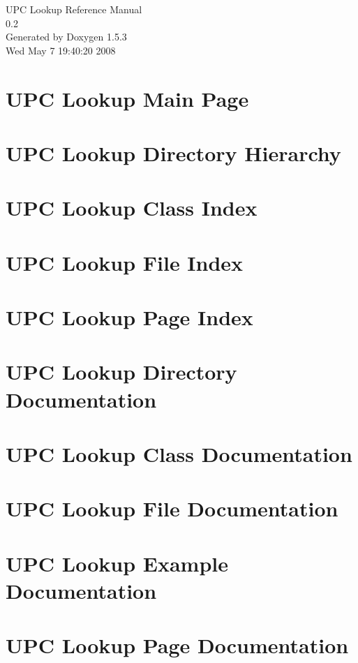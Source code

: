 \documentclass[letterpaper]{book}
\begin{document}
\begin{titlepage}
\vspace*{7cm}
\begin{center}
{\Large UPC Lookup Reference Manual\\[1ex]\large 0.2 }\\
\vspace*{1cm}
{\large Generated by Doxygen 1.5.3}\\
\vspace*{0.5cm}
{\small Wed May 7 19:40:20 2008}\\
\end{center}
\end{titlepage}
\clearemptydoublepage
{}
\tableofcontents
\clearemptydoublepage
{}
\chapter{UPC Lookup Main Page}
\label{index}\hypertarget{index}{}
\chapter{UPC Lookup Directory Hierarchy}

\chapter{UPC Lookup Class Index}

\chapter{UPC Lookup File Index}

\chapter{UPC Lookup Page Index}

\chapter{UPC Lookup Directory Documentation}

\chapter{UPC Lookup Class Documentation}

\chapter{UPC Lookup File Documentation}












\chapter{UPC Lookup Example Documentation}

\chapter{UPC Lookup Page Documentation}




\printindex
\end{document}
